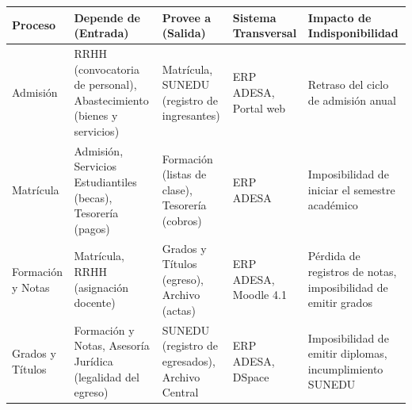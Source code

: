 \documentclass[10pt,letterpaper]{article}
\begin{document}
{\setlength{\RaggedRightRightskip}{0pt plus 5em}\small\sloppy \begin{longtable}[]{@{}
  >{\hspace{0pt}\RaggedRight\arraybackslash}p{}
  >{\hspace{0pt}\RaggedRight\arraybackslash}p{}
  >{\hspace{0pt}\RaggedRight\arraybackslash}p{}
  >{\hspace{0pt}\RaggedRight\arraybackslash}p{}
  >{\hspace{0pt}\RaggedRight\arraybackslash}p{}@{}}
\toprule\noalign{}
\begin{minipage}[b]{\linewidth}\raggedright
Proceso
\end{minipage} & \begin{minipage}[b]{\linewidth}\raggedright
Depende de (Entrada)
\end{minipage} & \begin{minipage}[b]{\linewidth}\raggedright
Provee a (Salida)
\end{minipage} & \begin{minipage}[b]{\linewidth}\raggedright
Sistema Transversal
\end{minipage} & \begin{minipage}[b]{\linewidth}\raggedright
Impacto de Indisponibilidad
\end{minipage} \\
\midrule\noalign{}
\endhead
\bottomrule\noalign{}
\endlastfoot
Admisión & RRHH (convocatoria de personal), Abastecimiento (bienes y
servicios) & Matrícula, SUNEDU (registro de ingresantes) & ERP ADESA,
Portal web & Retraso del ciclo de admisión anual \\
Matrícula & Admisión, Servicios Estudiantiles (becas), Tesorería (pagos)
& Formación (listas de clase), Tesorería (cobros) & ERP ADESA &
Imposibilidad de iniciar el semestre académico \\
Formación y Notas & Matrícula, RRHH (asignación docente) & Grados y
Títulos (egreso), Archivo (actas) & ERP ADESA, Moodle 4.1 & Pérdida de
registros de notas, imposibilidad de emitir grados \\
Grados y Títulos & Formación y Notas, Asesoría Jurídica (legalidad del
egreso) & SUNEDU (registro de egresados), Archivo Central & ERP ADESA,
DSpace & Imposibilidad de emitir diplomas, incumplimiento SUNEDU \\

\end{longtable}}
\end{document}
